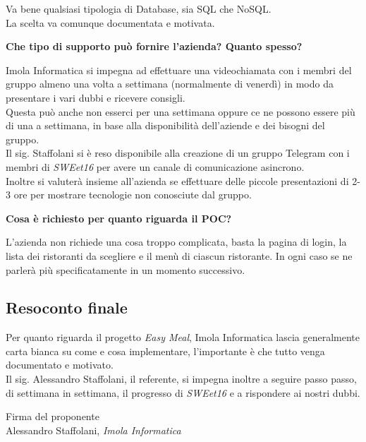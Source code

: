 \documentclass[a4paper, 11pt]{article}
\begin{document}
Va bene qualsiasi tipologia di Database, sia SQL che NoSQL.\\
La scelta va comunque documentata e motivata.\newline

\textbf{Che tipo di supporto può fornire l'azienda? Quanto spesso?}

Imola Informatica si impegna ad effettuare una videochiamata con i membri del gruppo almeno una volta a settimana (normalmente di venerdì) in modo da presentare i vari dubbi e ricevere consigli. \\
Questa può anche non esserci per una settimana oppure ce ne possono essere più di una a settimana, in base alla disponibilità dell'aziende e dei bisogni del gruppo. \\
Il sig. Staffolani si è reso disponibile alla creazione di un gruppo Telegram con i membri di \textit{SWEet16} per avere un canale di comunicazione asincrono. \\
Inoltre si valuterà insieme all'azienda se effettuare delle piccole presentazioni di 2-3 ore per mostrare tecnologie non conosciute dal gruppo. \newline

\textbf{Cosa è richiesto per quanto riguarda il POC?}

L'azienda non richiede una cosa troppo complicata, basta la pagina di login, la lista dei ristoranti da scegliere e il menù di ciascun ristorante.
In ogni caso se ne parlerà più specificatamente in un momento successivo.\newline

\subsection{Resoconto finale}

Per quanto riguarda il progetto \textit{Easy Meal}, Imola Informatica lascia generalmente carta bianca su come e cosa implementare, l'importante è che tutto venga documentato e motivato. \\
Il sig. Alessandro Staffolani, il referente, si impegna inoltre a seguire passo passo, di settimana in settimana, il progresso di \textit{SWEet16} e a rispondere ai nostri dubbi.

\vspace{200pt}
\begin{flushleft}
\hfill Firma del proponente \\
\vspace{50pt}
\hfill Alessandro Staffolani, \textit{Imola Informatica}
\end{flushleft}
\end{document}
